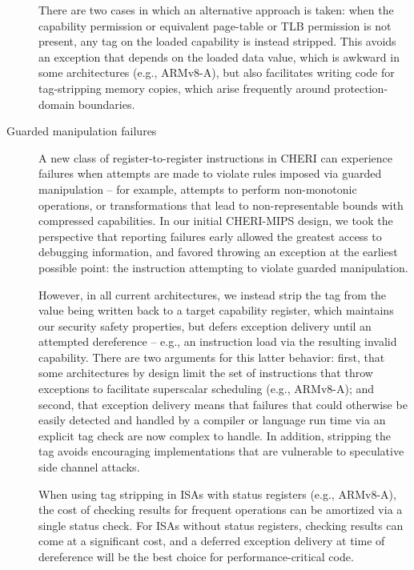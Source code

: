 \begin{description}
  There are two cases in which an alternative approach is taken: when the
  \cappermL capability permission or equivalent page-table or TLB
  permission is not present, any tag on the loaded capability is instead
  stripped.
  This avoids an exception that depends on the loaded data value, which is
  awkward in some architectures (e.g., ARMv8-A), but also facilitates writing
  code for tag-stripping memory copies, which arise frequently around
  protection-domain boundaries.

\item[Guarded manipulation failures]
  A new class of register-to-register instructions in CHERI can experience
  failures when attempts are made to violate rules imposed via guarded
  manipulation -- for example, attempts to perform non-monotonic operations, or
  transformations that lead to non-representable bounds with compressed
  capabilities.
  In our initial CHERI-MIPS design, we took the perspective that reporting
  failures early allowed the greatest access to debugging information, and
  favored throwing an exception at the earliest possible point: the
  instruction attempting to violate guarded manipulation.

  However, in all current architectures, we instead strip the tag from the value
  being written back to a target capability register, which maintains our
  security safety properties, but defers exception delivery until an attempted
  dereference -- e.g., an instruction load via the resulting invalid
  capability.
  There are two arguments for this latter behavior: first, that some
  architectures by design limit the set of instructions that throw exceptions
  to facilitate superscalar scheduling (e.g., ARMv8-A); and second, that
  exception delivery means that failures that could otherwise be easily
  detected and handled by a compiler or language run time via an explicit tag
  check are now complex to handle.
  In addition, stripping the tag avoids encouraging implementations that
  are vulnerable to speculative side channel attacks.

  When using tag stripping in ISAs with status registers (e.g., ARMv8-A), the
  cost of checking results for frequent operations can be amortized via a
  single status check.
  For ISAs without status registers, checking results can come at a
  significant cost, and a deferred exception delivery at time of dereference
  will be the best choice for performance-critical code.
\end{description}


